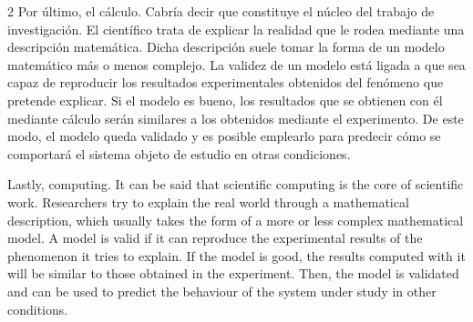 \begin{paracol}{2}
\switchcolumn
Por último, el cálculo.  Cabría decir que constituye el núcleo del trabajo de investigación. El científico trata de explicar la realidad que le rodea mediante una descripción matemática. Dicha descripción suele tomar la forma de un modelo matemático más o menos complejo. La validez de un modelo está ligada a que sea capaz de reproducir los resultados experimentales obtenidos del fenómeno que pretende explicar. Si el modelo es bueno, los resultados que se obtienen con él mediante cálculo serán similares a los obtenidos mediante el experimento. De este modo, el modelo queda validado y es posible emplearlo para predecir cómo se comportará el sistema objeto de estudio en otras condiciones.

\switchcolumn
Lastly, computing.  It can be said that scientific computing is the core of scientific work. Researchers try to explain the real world through a mathematical description, which usually takes the form of a more or less complex mathematical model. A model is valid if it can reproduce the experimental results of the phenomenon it tries to explain. If the model is good, the results computed with it will be similar to those obtained in the experiment. Then, the model is validated and can be used to predict the behaviour of the system under study in other conditions.
\end{paracol}

